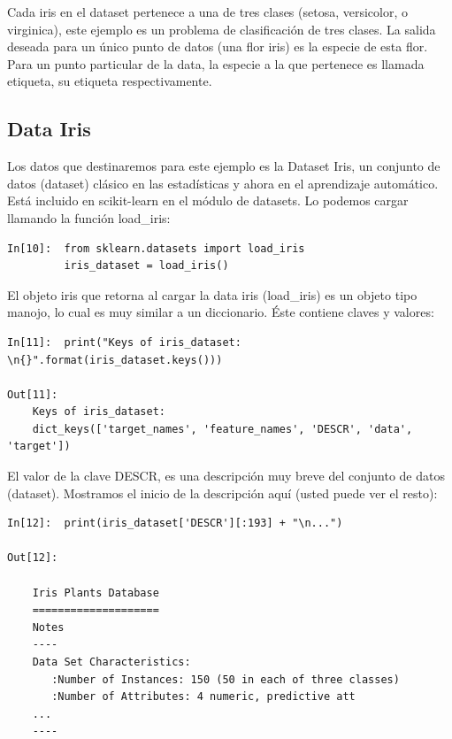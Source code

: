 Cada iris en el dataset pertenece a una de tres clases (setosa, versicolor, o virginica), este ejemplo es un problema de clasificación de tres clases. La salida deseada para un único punto de datos (una flor iris) es la especie de esta flor. Para un punto particular de la data, la especie a la que  pertenece es llamada  etiqueta, su etiqueta respectivamente.


\subsection{Data Iris}

Los datos que destinaremos para este ejemplo es la Dataset Iris, un conjunto de datos (dataset) clásico en  las estadísticas y ahora en el aprendizaje automático. Está incluido en scikit-learn en el módulo de datasets. Lo podemos cargar llamando la función load\_iris:\\

\begin{lstlisting}
In[10]:  from sklearn.datasets import load_iris
         iris_dataset = load_iris()
\end{lstlisting}


El objeto  iris  que retorna al cargar  la data iris (load\_iris) es un objeto tipo manojo, lo cual es muy similar a un diccionario. Éste contiene claves y valores:\\

\begin{lstlisting}
In[11]:  print("Keys of iris_dataset: \n{}".format(iris_dataset.keys()))

Out[11]:  
    Keys of iris_dataset:
    dict_keys(['target_names', 'feature_names', 'DESCR', 'data', 'target'])
\end{lstlisting}


El valor de la  clave DESCR, es una descripción muy breve del conjunto de datos (dataset). Mostramos el inicio de la descripción aquí (usted puede ver el resto):\\

\begin{lstlisting}
In[12]:  print(iris_dataset['DESCR'][:193] + "\n...")

Out[12]:

    Iris Plants Database
    ====================
    Notes
    ----
    Data Set Characteristics:
       :Number of Instances: 150 (50 in each of three classes)
       :Number of Attributes: 4 numeric, predictive att
    ...
    ----
\end{lstlisting} 


